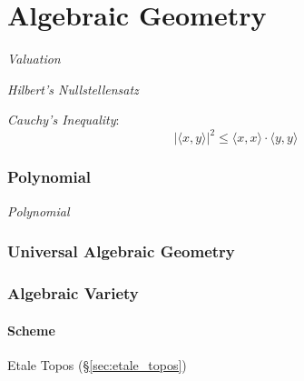 \part{Algebraic Geometry}\label{sec:algebraic_geometry}

\emph{Valuation}

\emph{Hilbert's Nullstellensatz}

\emph{Cauchy's Inequality}:
\[
    |\langle x,y \rangle|^2 \leq \langle x,x \rangle \cdot \langle
    y,y \rangle
\]



\section{Polynomial}\label{sec:polynomial}

\emph{Polynomial}



\section{Universal Algebraic Geometry}



\section{Algebraic Variety}\label{sec:algebraic_variety}

\subsection{Scheme}\label{sec:scheme}

Etale Topos (\S\ref{sec:etale_topos})
